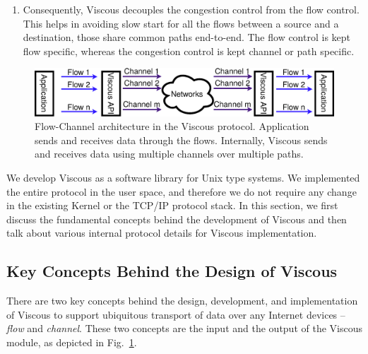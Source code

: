 \begin{enumerate}
	\item Consequently, Viscous decouples the congestion control from the flow control. This helps in avoiding slow start for all the flows between a source and a destination, those share common paths end-to-end. The flow control is kept flow specific, whereas the congestion control is kept channel or path specific. 
\end{enumerate}



\begin{figure}[!ht]
	\centering
	\includegraphics[width=0.9\linewidth]{img/sys-io}
	\caption{Flow-Channel architecture in the Viscous protocol. Application sends and receives data through the flows. Internally, Viscous sends and receives data using multiple channels over multiple paths.}
	\label{fig:sys-io}
\end{figure}




%
We develop Viscous as a software library for Unix type systems. We implemented the entire protocol in the user space, and therefore we do not require any change in the existing Kernel or the TCP/IP protocol stack. In this section, we first discuss the fundamental concepts behind the development of Viscous and then talk about various internal protocol details for Viscous implementation.
%
\subsection{Key Concepts Behind the Design of Viscous}
There are two key concepts behind the design, development, and implementation of Viscous to support ubiquitous transport of data over any Internet devices -- \textit{flow} and \textit{channel}. These two concepts are the input and the output of the Viscous module, as depicted in Fig.~\ref{fig:sys-io}.

